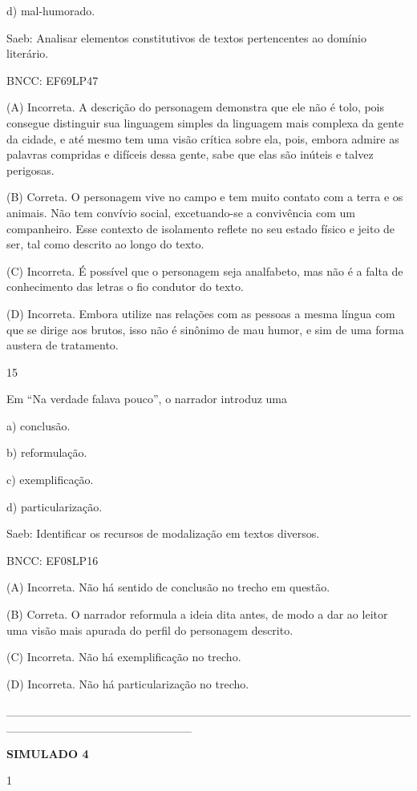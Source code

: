 d) mal-humorado.

Saeb: Analisar elementos constitutivos de textos pertencentes ao domínio
literário.

BNCC: EF69LP47

(A) Incorreta. A descrição do personagem demonstra que ele não é tolo,
pois consegue distinguir sua linguagem simples da linguagem mais
complexa da gente da cidade, e até mesmo tem uma visão crítica sobre
ela, pois, embora admire as palavras compridas e difíceis dessa gente,
sabe que elas são inúteis e talvez perigosas.

(B) Correta. O personagem vive no campo e tem muito contato com a terra
e os animais. Não tem convívio social, excetuando-se a convivência com
um companheiro. Esse contexto de isolamento reflete no seu estado físico
e jeito de ser, tal como descrito ao longo do texto.

(C) Incorreta. É possível que o personagem seja analfabeto, mas não é a
falta de conhecimento das letras o fio condutor do texto.

(D) Incorreta. Embora utilize nas relações com as pessoas a mesma língua
com que se dirige aos brutos, isso não é sinônimo de mau humor, e sim de
uma forma austera de tratamento.

\num{15}

Em ``Na verdade falava pouco'', o narrador introduz uma

a) conclusão.

b) reformulação.

c) exemplificação.

d) particularização.

Saeb: Identificar os recursos de modalização em textos diversos.

BNCC: EF08LP16

(A) Incorreta. Não há sentido de conclusão no trecho em questão.

(B) Correta. O narrador reformula a ideia dita antes, de modo a dar ao
leitor uma visão mais apurada do perfil do personagem descrito.

(C) Incorreta. Não há exemplificação no trecho.

(D) Incorreta. Não há particularização no trecho.

\_\_\_\_\_\_\_\_\_\_\_\_\_\_\_\_\_\_\_\_\_\_\_\_\_\_\_\_\_\_\_\_\_\_\_\_\_\_\_\_\_\_\_\_\_\_\_\_\_\_\_\_\_\_\_\_\_\_\_\_\_\_\_\_\_\_\_\_\_\_

\textbf{{SIMULADO 4}}

\num{1}

